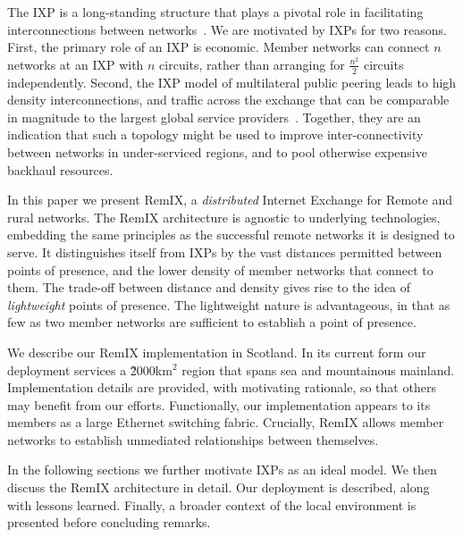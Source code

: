 The \acf{IXP} is a long-standing structure that plays a pivotal role in
facilitating interconnections between networks~\cite{Ager:2012,Chatzis:2013}. We
are motivated by \acp{IXP} for two reasons. First, the primary role of an
\ac{IXP} is economic. Member networks can connect $n$ networks at an IXP with
$n$ circuits, rather than arranging for $\frac{n^2}{2}$ circuits independently.
Second, the \ac{IXP} model of multilateral public peering leads to high density
interconnections, and traffic across the exchange that can be comparable in
magnitude to the largest global service providers~\cite{Ager:2012}. Together,
they are an indication that such a topology might be used to improve
inter-connectivity between networks in under-serviced regions, and to pool
otherwise expensive backhaul resources.

In this paper we present RemIX, a \emph{distributed} Internet Exchange for
Remote and rural networks. The RemIX architecture is agnostic to underlying
technologies, embedding the same principles as the successful remote networks it
is designed to serve. It distinguishes itself from \acp{IXP} by the vast
distances permitted between points of presence, and the lower density of member
networks that connect to them. The trade-off between distance and density gives
rise to the idea of \emph{lightweight} points of presence. The lightweight
nature is advantageous, in that as few as two member networks are sufficient to
establish a point of presence.

We describe our RemIX implementation in Scotland. In its current form our
deployment services a \~2000km$^2$ region that spans sea and mountainous
mainland. Implementation details are provided, with motivating rationale, so
that others may benefit from our efforts. Functionally, our implementation
appears to its members as a large Ethernet switching fabric. Crucially, RemIX
allows member networks to establish unmediated relationships between themselves.

In the following sections we further motivate \acp{IXP} as an ideal model. We
then discuss the RemIX architecture in detail. Our deployment is described,
along with lessons learned. Finally, a broader context of the local environment
is presented before concluding remarks.
